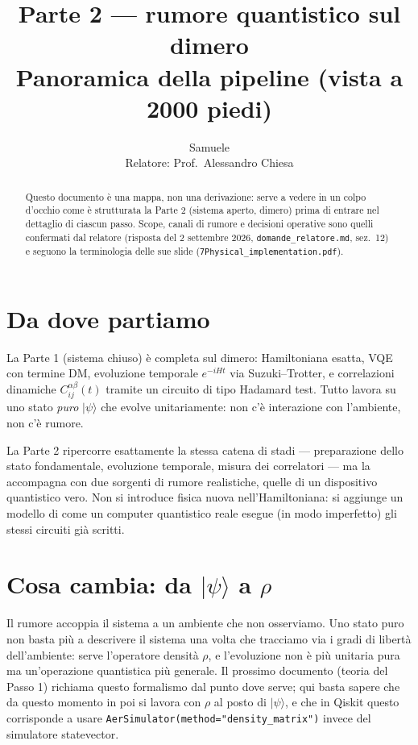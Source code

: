 \documentclass[11pt,a4paper]{article}
\title{Parte 2 --- rumore quantistico sul dimero\\
\large Panoramica della pipeline (vista a 2000 piedi)}
\author{Samuele \\ Relatore: Prof.\ Alessandro Chiesa}
\date{}
\newcommand{\ket}[1]{\lvert #1 \rangle}
\begin{document}
\maketitle

\begin{abstract}
\noindent Questo documento è una mappa, non una derivazione: serve a vedere in un colpo
d'occhio come è strutturata la Parte 2 (sistema aperto, dimero) prima di entrare nel
dettaglio di ciascun passo. Scope, canali di rumore e decisioni operative sono quelli
confermati dal relatore (risposta del 2 settembre 2026, \texttt{domande\_relatore.md},
sez.\ 12) e seguono la terminologia delle sue slide (\texttt{7Physical\_implementation.pdf}).
\end{abstract}

\tableofcontents

\section{Da dove partiamo}

La Parte 1 (sistema chiuso) è completa sul dimero: Hamiltoniana esatta, VQE con termine
DM, evoluzione temporale $e^{-iHt}$ via Suzuki--Trotter, e correlazioni dinamiche
$C_{ij}^{\alpha\beta}(t)$ tramite un circuito di tipo Hadamard test. Tutto lavora su uno
stato \emph{puro} $\ket{\psi}$ che evolve unitariamente: non c'è interazione con
l'ambiente, non c'è rumore.

La Parte 2 ripercorre esattamente la stessa catena di stadi --- preparazione dello stato
fondamentale, evoluzione temporale, misura dei correlatori --- ma la accompagna con due
sorgenti di rumore realistiche, quelle di un dispositivo quantistico vero. Non si
introduce fisica nuova nell'Hamiltoniana: si aggiunge un modello di come un computer
quantistico reale esegue (in modo imperfetto) gli stessi circuiti già scritti.

\section{Cosa cambia: da $\ket{\psi}$ a $\rho$}

Il rumore accoppia il sistema a un ambiente che non osserviamo. Uno stato puro non basta
più a descrivere il sistema una volta che tracciamo via i gradi di libertà
dell'ambiente: serve l'operatore densità $\rho$, e l'evoluzione non è più unitaria pura
ma un'operazione quantistica più generale. Il prossimo documento (teoria del Passo 1)
richiama questo formalismo dal punto dove serve; qui basta sapere che da questo momento
in poi si lavora con $\rho$ al posto di $\ket{\psi}$, e che in Qiskit questo corrisponde
a usare \texttt{AerSimulator(method="density\_matrix")} invece del simulatore
statevector.
\end{document}
